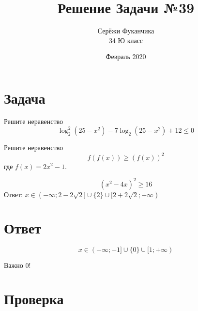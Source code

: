 \documentclass{article}
\title{Решение Задачи №39}
\author{Серёжи Фуканчика\\34 Ю класс}
\date{Февраль 2020}
\begin{document}
\maketitle

\section{Задача}
Решите неравенство
$$\log_{2}^{2}(25-x^2)-7\log_{2}(25-x^2)+12 \leq 0$$

Решите неравенство
$$f(f(x))\ge{}(f(x))^2$$
где $f(x)=2x^2-1$.

$$(x^2-4x)^2\ge{}16$$
Ответ: $x\in{}(-\infty;2-2\sqrt{2}]\cup\{2\}\cup{}[2+2\sqrt{2};+\infty)$

\section{Ответ}
$$x\in{}(-\infty;-1]\cup{}\{0\}\cup{}[1;+\infty)$$

Важно ${0}$!

\section{Проверка}
\end{document}
